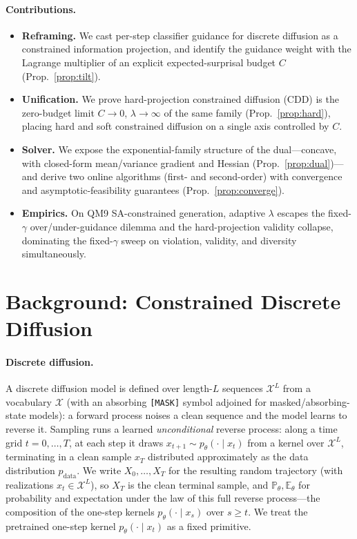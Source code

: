 \documentclass{article}
\newcommand{\E}{\mathbb{E}}
\newcommand{\X}{\mathcal{X}}
\begin{document}
\paragraph{Contributions.}
\begin{itemize}
\item \textbf{Reframing.} We cast per-step classifier guidance for discrete diffusion as a constrained information projection, and identify the guidance weight with the Lagrange multiplier of an explicit expected-surprisal budget $C$ (Prop.~\ref{prop:tilt}).
\item \textbf{Unification.} We prove hard-projection constrained diffusion (CDD) is the zero-budget limit $C\!\to\!0$, $\lambda\!\to\!\infty$ of the same family (Prop.~\ref{prop:hard}), placing hard and soft constrained diffusion on a single axis controlled by $C$.
\item \textbf{Solver.} We expose the exponential-family structure of the dual---concave, with closed-form mean/variance gradient and Hessian (Prop.~\ref{prop:dual})---and derive two online algorithms (first- and second-order) with convergence and asymptotic-feasibility guarantees (Prop.~\ref{prop:converge}).
\item \textbf{Empirics.} On QM9 SA-constrained generation, adaptive $\lambda$ escapes the fixed-$\gamma$ over/under-guidance dilemma and the hard-projection validity collapse, dominating the fixed-$\gamma$ sweep on violation, validity, and diversity simultaneously.
\end{itemize}

\section{Background: Constrained Discrete Diffusion}
\label{sec:background}

\paragraph{Discrete diffusion.} A discrete diffusion model is defined over length-$L$ sequences $\X^L$ from a vocabulary $\X$ (with an absorbing \texttt{[MASK]} symbol adjoined for masked/absorbing-state models): a forward process noises a clean sequence and the model learns to reverse it. Sampling runs a learned \emph{unconditional} reverse process: along a time grid $t=0,\dots,T$, at each step it draws $x_{t+1}\sim p_\theta(\cdot\mid x_t)$ from a kernel over $\X^L$, terminating in a clean sample $x_T$ distributed approximately as the data distribution $p_{\mathrm{data}}$. We write $X_0,\dots,X_T$ for the resulting random trajectory (with realizations $x_t\in\X^L$), so $X_T$ is the clean terminal sample, and $\mathbb P_\theta,\E_\theta$ for probability and expectation under the law of this full reverse process---the composition of the one-step kernels $p_\theta(\cdot\mid x_s)$ over $s\ge t$. We treat the pretrained one-step kernel $p_\theta(\cdot\mid x_t)$ as a fixed primitive.
\end{document}
